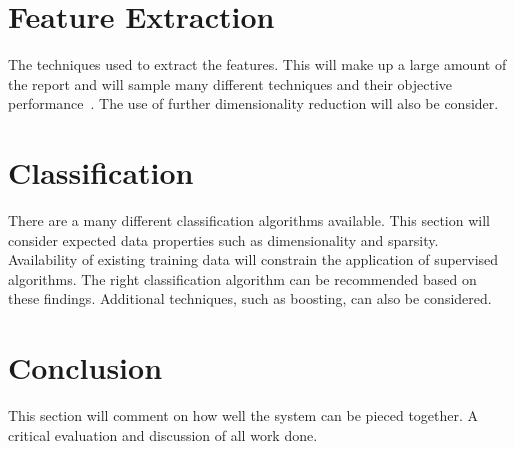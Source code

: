 \documentclass[journal]{IEEEtran}
\begin{document}
\section{Feature Extraction}
\label{FeatureExtraction}

The techniques used to extract the features.
This will make up a large amount of the report and will sample many different techniques and their objective performance~\cite{lohmann1998volumetric}.
The use of further dimensionality reduction will also be consider.


\section{Classification}
\label{Classification}

There are a many different classification algorithms available.
This section will consider expected data properties such as dimensionality and sparsity.
Availability of existing training data will constrain the application of supervised algorithms. 
The right classification algorithm can be recommended based on these findings.
Additional techniques, such as boosting, can also be considered.

\section{Conclusion}
\label{Conclusion}

This section will comment on how well the system can be pieced together.
A critical evaluation and discussion of all work done.




\end{document}
